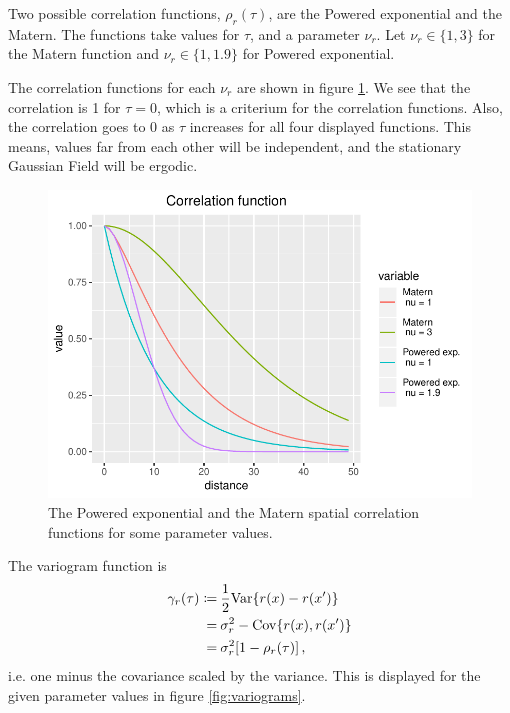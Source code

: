 Two possible correlation functions, $\rho_r(\tau)$, are the Powered exponential and the Matern. The functions take values for $\tau$, and a parameter $\nu_r$. Let $\nu_r \in \{1,3\}$ for the Matern function and $\nu_r \in \{1,1.9\}$ for Powered exponential. 

The correlation functions for each $\nu_r$ are shown in figure \ref{fig:corrfunc}. We see that the correlation is 1 for $\tau = 0$, which is a criterium for the correlation functions. Also, the correlation goes to 0 as $\tau$ increases for all four displayed functions. This means, values far from each other will be independent, and the stationary Gaussian Field will be ergodic.

\begin{figure}
    \centering
    \includegraphics{figures/corrfunc.pdf}
    \caption{The Powered exponential and the Matern spatial correlation functions for some parameter values.}
    \label{fig:corrfunc}
\end{figure}

The variogram function is
%
\begin{align*}
\gamma_r(\tau)
\coloneqq&\: \frac{1}{2} \mathrm{Var} \{ r(x) - r(x') \} \\
=&\: \sigma_r^2 - \mathrm{Cov}\{r(x), r(x')\} \\
=&\: \sigma_r^2[1 - \rho_r(\tau)] \, ,
\end{align*}
%
i.e. one minus the covariance scaled by the variance. This is displayed for the given parameter values in figure \ref{fig:variograms}.

